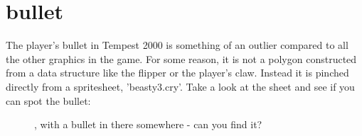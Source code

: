 \chapter{bullet}
\lhead[tempest 2000]{}
\label{sec:bullet}
\lstset{style=68KStyle}

The player's bullet in Tempest 2000 is something of an outlier compared to all the other graphics in the game.
For some reason, it is not a polygon constructed from a data structure like the flipper or the player's claw.
Instead it is pinched directly from a spritesheet, 'beasty3.cry'. Take a look at the sheet and see if you can
spot the bullet:
\begin{figure}[H]
    \centering
    \begin{adjustbox}{width=12cm,center}
    \end{adjustbox}
\caption{, with a bullet in there somewhere - can you find it?}
\end{figure}

